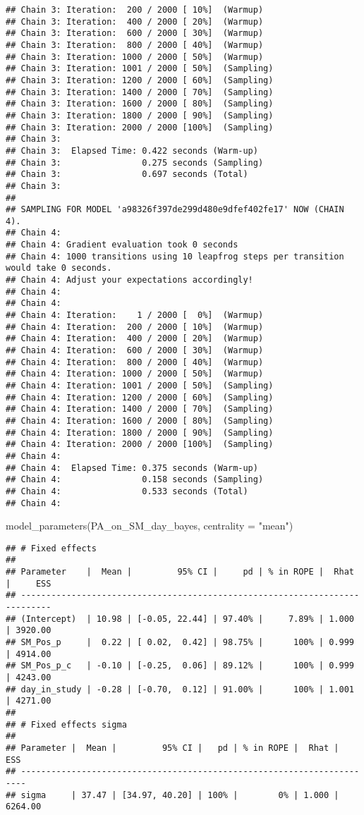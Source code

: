 \documentclass[
]{article}
\newenvironment{Shaded}{\begin{snugshade}}{\end{snugshade}}
\newcommand{\AttributeTok}[1]{\textcolor[rgb]{0.77,0.63,0.00}{#1}}
\newcommand{\FunctionTok}[1]{\textcolor[rgb]{0.00,0.00,0.00}{#1}}
\newcommand{\NormalTok}[1]{#1}
\newcommand{\StringTok}[1]{\textcolor[rgb]{0.31,0.60,0.02}{#1}}
\begin{document}
\begin{verbatim}
## Chain 3: Iteration:  200 / 2000 [ 10%]  (Warmup)
## Chain 3: Iteration:  400 / 2000 [ 20%]  (Warmup)
## Chain 3: Iteration:  600 / 2000 [ 30%]  (Warmup)
## Chain 3: Iteration:  800 / 2000 [ 40%]  (Warmup)
## Chain 3: Iteration: 1000 / 2000 [ 50%]  (Warmup)
## Chain 3: Iteration: 1001 / 2000 [ 50%]  (Sampling)
## Chain 3: Iteration: 1200 / 2000 [ 60%]  (Sampling)
## Chain 3: Iteration: 1400 / 2000 [ 70%]  (Sampling)
## Chain 3: Iteration: 1600 / 2000 [ 80%]  (Sampling)
## Chain 3: Iteration: 1800 / 2000 [ 90%]  (Sampling)
## Chain 3: Iteration: 2000 / 2000 [100%]  (Sampling)
## Chain 3: 
## Chain 3:  Elapsed Time: 0.422 seconds (Warm-up)
## Chain 3:                0.275 seconds (Sampling)
## Chain 3:                0.697 seconds (Total)
## Chain 3: 
## 
## SAMPLING FOR MODEL 'a98326f397de299d480e9dfef402fe17' NOW (CHAIN 4).
## Chain 4: 
## Chain 4: Gradient evaluation took 0 seconds
## Chain 4: 1000 transitions using 10 leapfrog steps per transition would take 0 seconds.
## Chain 4: Adjust your expectations accordingly!
## Chain 4: 
## Chain 4: 
## Chain 4: Iteration:    1 / 2000 [  0%]  (Warmup)
## Chain 4: Iteration:  200 / 2000 [ 10%]  (Warmup)
## Chain 4: Iteration:  400 / 2000 [ 20%]  (Warmup)
## Chain 4: Iteration:  600 / 2000 [ 30%]  (Warmup)
## Chain 4: Iteration:  800 / 2000 [ 40%]  (Warmup)
## Chain 4: Iteration: 1000 / 2000 [ 50%]  (Warmup)
## Chain 4: Iteration: 1001 / 2000 [ 50%]  (Sampling)
## Chain 4: Iteration: 1200 / 2000 [ 60%]  (Sampling)
## Chain 4: Iteration: 1400 / 2000 [ 70%]  (Sampling)
## Chain 4: Iteration: 1600 / 2000 [ 80%]  (Sampling)
## Chain 4: Iteration: 1800 / 2000 [ 90%]  (Sampling)
## Chain 4: Iteration: 2000 / 2000 [100%]  (Sampling)
## Chain 4: 
## Chain 4:  Elapsed Time: 0.375 seconds (Warm-up)
## Chain 4:                0.158 seconds (Sampling)
## Chain 4:                0.533 seconds (Total)
## Chain 4:
\end{verbatim}

\begin{Shaded}
\begin{Highlighting}[]
\FunctionTok{model\_parameters}\NormalTok{(PA\_on\_SM\_day\_bayes, }\AttributeTok{centrality =} \StringTok{"mean"}\NormalTok{)}
\end{Highlighting}
\end{Shaded}

\begin{verbatim}
## # Fixed effects
## 
## Parameter    |  Mean |         95% CI |     pd | % in ROPE |  Rhat |     ESS
## ----------------------------------------------------------------------------
## (Intercept)  | 10.98 | [-0.05, 22.44] | 97.40% |     7.89% | 1.000 | 3920.00
## SM_Pos_p     |  0.22 | [ 0.02,  0.42] | 98.75% |      100% | 0.999 | 4914.00
## SM_Pos_p_c   | -0.10 | [-0.25,  0.06] | 89.12% |      100% | 0.999 | 4243.00
## day_in_study | -0.28 | [-0.70,  0.12] | 91.00% |      100% | 1.001 | 4271.00
## 
## # Fixed effects sigma
## 
## Parameter |  Mean |         95% CI |   pd | % in ROPE |  Rhat |     ESS
## -----------------------------------------------------------------------
## sigma     | 37.47 | [34.97, 40.20] | 100% |        0% | 1.000 | 6264.00
\end{verbatim}
\end{document}

